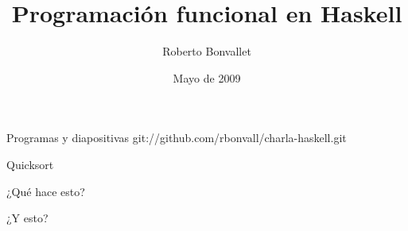 \documentclass[12pt]{beamer}
\title {Programación funcional en Haskell}
\author{Roberto Bonvallet}
\institute[]{
    Departamento de Informática \\
    Universidad Técnica Federico Santa María
}
\date{Mayo de 2009}
\begin{document}
\begin{frame}
    \titlepage
\end{frame}

\begin{frame}
    \begin{block}{Programas y diapositivas}
        git://github.com/rbonvall/charla-haskell.git
    \end{block}
\end{frame}
    
\begin{frame}[fragile]
    
\end{frame}

\begin{frame}[fragile]
    
\end{frame}

\begin{frame}[fragile]
    
\end{frame}

\begin{frame}[fragile]
    
\end{frame}

\begin{frame}[fragile]
    \begin{block}{Quicksort}
        
    \end{block}
\end{frame}

\begin{frame}[fragile]
    \begin{block}{¿Qué hace esto?}
        
    \end{block}
    \begin{block}{¿Y esto?}
        
    \end{block}
\end{frame}
\end{document}
